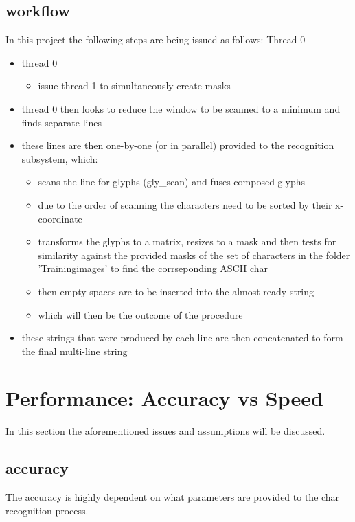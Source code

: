 \documentclass[12pt]{scrartcl}
\begin{document}
  \subsection{workflow}
In this project the following steps are being issued as follows:\newline
Thread 0
\begin{itemize}
\item thread 0
  \begin{itemize}
    \item issue thread 1 to simultaneously create masks
  \end {itemize}
\item thread 0 then looks to reduce the window to be scanned to a minimum and finds separate lines
\item these lines are then one-by-one (or in parallel) provided to the recognition subsystem, which:
  \begin{itemize}
  \item scans the line for glyphs (gly\_scan) and fuses composed glyphs
  \item due to the order of scanning the characters need to be sorted by their x-coordinate  
  \item transforms the glyphs to a matrix, resizes to a mask and then tests for similarity against the provided masks of the set of characters in the folder 'Trainingimages' to find the corrseponding ASCII char  
  \item then empty spaces are to be inserted into the almost ready string
  \item which will then be the outcome of the procedure
  \end{itemize}
\item these strings that were produced by each line are then concatenated to form the final multi-line string
\end{itemize}

\section {Performance: Accuracy vs Speed}

In this section the aforementioned issues and assumptions will be discussed.

\subsection {accuracy}
The accuracy is highly dependent on what parameters are provided to the char recognition process.
\end{document}
